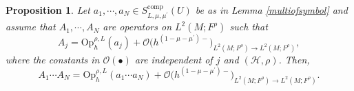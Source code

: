\documentclass[11pt,oneside,reqno]{amsart}
\newtheorem{proposition}[theorem]{Proposition}
\theoremstyle{definition}
\numberwithin{equation}{section}
\theoremstyle{plain}
\begin{document}
\begin{proposition}\label{multiplicationofoperators}
Let $a_1, \cdots, a_N \in S_{L, \mu, \mu^{\prime}}^{\mathrm{comp}}(U)$ be as in Lemma \ref{multiofsymbol} and assume that $A_1, \cdots, A_N$ are operators on $L^2(M;F^{\rho})$ such that 
\begin{equation*}
    A_j=\mathrm{Op}_h^{\rho,L}(a_j)+\mathcal{O} \big(h^{(1-\mu-\mu^{\prime})-} \big)_{L^2(M;F^\rho) \rightarrow L^2(M;F^\rho)} ,
\end{equation*}
where the constants in $\mathcal{O}(\bullet)$ are independent of $j$ and $(\mathcal{H},\rho)$. Then,
\begin{equation*}
    A_1 \cdots A_N=\mathrm{Op}_h^{\rho,L} (a_1 \cdots a_N )+\mathcal{O} \big(h^{(1-\mu-\mu^{\prime})-} \big)_{L^2(M;F^\rho) \rightarrow L^2(M;F^\rho)}.
\end{equation*}
\end{proposition}
\end{document}
